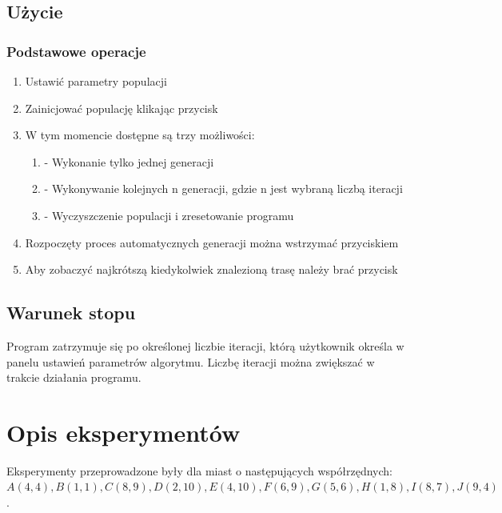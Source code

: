 \documentclass[a4paper,11pt]{article}
\begin{document}
		\subsection{Użycie}
			\subsubsection{Podstawowe operacje}
				\begin{enumerate}
					\item Ustawić parametry populacji
					\item Zainicjować populację klikając przycisk 
					\item W tym momencie dostępne są trzy możliwości:
					\begin{enumerate}
						\item {} - Wykonanie tylko jednej generacji
						\item {} - Wykonywanie kolejnych n generacji, gdzie n jest wybraną liczbą iteracji
						\item {} - Wyczyszczenie populacji i zresetowanie programu
					\end{enumerate}
					\item Rozpoczęty proces automatycznych generacji można wstrzymać przyciskiem 
					\item Aby zobaczyć najkrótszą kiedykolwiek znalezioną trasę należy brać przycisk 
				\end{enumerate}
			
		\subsection{Warunek stopu}
		Program zatrzymuje się po określonej liczbie iteracji, którą użytkownik określa w panelu ustawień parametrów algorytmu. Liczbę iteracji można zwiększać w trakcie działania programu.
		
	\section{Opis eksperymentów}
	Eksperymenty przeprowadzone były dla miast o następujących współrzędnych:  $A(4,4), B(1,1), C(8,9), D(2,10), E(4,10), F(6,9), G(5,6), H(1,8), I(8,7), J(9,4)$.
	
\end{document}

